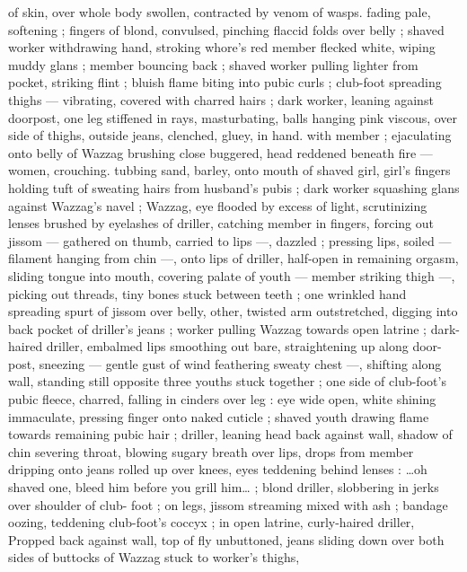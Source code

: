 of skin, over whole body swollen, contracted by venom of wasps. 
fading pale, softening ; fingers of blond, convulsed, pinching flaccid 
folds over belly ; shaved worker withdrawing hand, stroking whore's 
red member flecked white, wiping muddy glans ; member bouncing 
back ; shaved worker pulling lighter from pocket, striking flint ; bluish 
flame biting into pubic curls ; club-foot spreading thighs --- 
vibrating, covered with charred hairs ; dark worker, leaning against 
doorpost, one leg stiffened in rays, masturbating, balls hanging pink 
viscous, over side of thighs, outside jeans, clenched, gluey, in hand. 
with member ; ejaculating onto belly of Wazzag brushing close 
buggered, head reddened beneath fire --- women, crouching. 
tubbing sand, barley, onto mouth of shaved girl, girl's fingers 
holding tuft of sweating hairs from husband's pubis ; dark worker 
squashing glans against Wazzag's navel ; Wazzag, eye flooded by 
excess of light, scrutinizing lenses brushed by eyelashes of driller, 
catching member in fingers, forcing out jissom --- gathered on 
thumb, carried to lips ---, dazzled ; pressing lips, soiled --- filament 
hanging from chin ---, onto lips of driller, half-open in remaining 
orgasm, sliding tongue into mouth, covering palate of youth --- 
member striking thigh ---, picking out threads, tiny bones stuck 
between teeth ; one wrinkled hand spreading spurt of jissom over 
belly, other, twisted arm outstretched, digging into back pocket of 
driller's jeans ; worker pulling Wazzag towards open latrine ; dark- 
haired driller, embalmed lips smoothing out bare, straightening up 
along door-post, sneezing --- gentle gust of wind feathering sweaty 
chest ---, shifting along wall, standing still opposite three youths 
stuck together ; one side of club-foot's pubic fleece, charred, falling 
in cinders over leg : eye wide open, white shining immaculate, 
pressing finger onto naked cuticle ; shaved youth drawing flame 
towards remaining pubic hair ; driller, leaning head back against wall, 
shadow of chin severing throat, blowing sugary breath over lips, 
drops from member dripping onto jeans rolled up over knees, eyes 
teddening behind lenses : {\gl}{\ldots}oh shaved one, bleed him before you 
grill him{\ldots}{\gr} ; blond driller, slobbering in jerks over shoulder of club- 
foot ; on legs, jissom streaming mixed with ash ; bandage oozing, 
teddening club-foot's coccyx ; in open latrine, curly-haired driller, 
Propped back against wall, top of fly unbuttoned, jeans sliding down 
over both sides of buttocks of Wazzag stuck to worker's thighs, 
